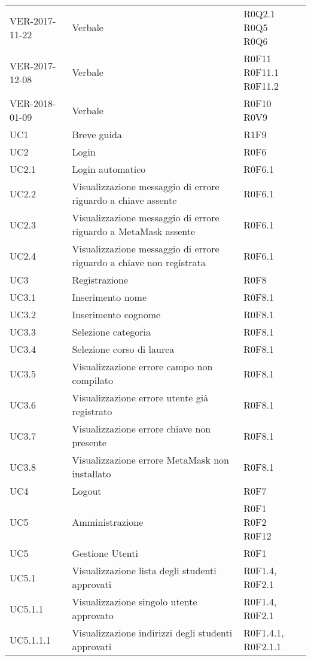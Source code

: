\documentclass[AnalisiDeiRequisiti.tex]{subfiles}
\begin{document}
\begin{longtable}[H]{p{2cm}p{5cm}p{5cm}}
	VER-2017-11-22 & Verbale & \makecell[tl]{ R0Q2.1 \\
	 R0Q5 \\
	 R0Q6 } \\
	
	VER-2017-12-08 & Verbale & \makecell[tl]{ R0F11 \\
	 R0F11.1 \\
	 R0F11.2 } \\
	VER-2018-01-09 & Verbale & \makecell[tl]{ R0F10 \\
	R0V9 } \\ 
	
	UC1 & Breve guida & R1F9 \\
	UC2 & Login & R0F6 \\
	UC2.1 & Login automatico & R0F6.1 \\
	UC2.2 & Visualizzazione messaggio di errore riguardo a chiave assente & R0F6.1 \\
	UC2.3 & Visualizzazione messaggio di errore riguardo a MetaMask assente & R0F6.1 \\
	UC2.4 & Visualizzazione messaggio di errore riguardo a chiave non registrata & R0F6.1 \\
	UC3 & Registrazione & R0F8 \\
	UC3.1 & Inserimento nome & R0F8.1 \\
	UC3.2 & Inserimento cognome & R0F8.1 \\
	UC3.3 & Selezione categoria & R0F8.1 \\
	UC3.4 & Selezione corso di laurea & R0F8.1 \\
	UC3.5 & Visualizzazione errore campo non compilato & R0F8.1 \\
	UC3.6 & Visualizzazione errore utente già registrato & R0F8.1 \\
	UC3.7 & Visualizzazione errore chiave non presente & R0F8.1 \\
	UC3.8 & Visualizzazione errore MetaMask non installato & R0F8.1 \\
	UC4 & Logout & R0F7 \\
	UC5 & Amministrazione & \makecell[tl]{ R0F1 \\
		R0F2 \\
		R0F12 } \\
	UC5 & Gestione Utenti & R0F1 \\
	UC5.1 & Visualizzazione lista degli studenti approvati & R0F1.4, R0F2.1 \\
	UC5.1.1 & Visualizzazione singolo utente approvato & R0F1.4, R0F2.1 \\
	UC5.1.1.1 & Visualizzazione indirizzi degli studenti approvati & R0F1.4.1, R0F2.1.1 \\

\end{longtable}
\end{document}
